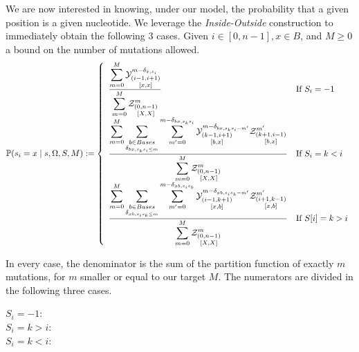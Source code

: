 We are now interested in knowing, under our model, 
 the probability that a given position is a given nucleotide.
We leverage the \emph{Inside-Outside} construction to immediately obtain the following $3$ cases.
Given $i\in[0,n-1],x\in B$, and $M\geq 0$ a bound on the number of mutations allowed. 
$$
	\mathbb{P}(s_i = x\mid s,\Omega, S,M):=\left\{
	\begin{array}{ll}
		\displaystyle
		\frac{
			\displaystyle
			\sum_{m=0}^{M}
			\Y{i-1,i+1}{m-\Kron_{x,s_i}}{x,x}
		}{
			\displaystyle
			\sum_{m=0}^{M}
			\Z{0,n-1}{m}{X,X}
		}
		&\text{If }S_i = -1\\
		\displaystyle
 		\frac{
			\displaystyle
			\sum_{m=0}^{M}
			\sum_{\substack{b\in Bases\\\Kron_{bx,s_ks_i\leq m}}}
			\sum_{m'=0}^{m-\Kron_{bx,s_ks_i}}
			\Y{k-1,i+1}{m-\Kron_{bx,s_ks_i-m'}}{b,x}
			\Z{k+1,i-1}{m'}{b,x}
		}{
			\displaystyle
			\sum_{m=0}^{M}
			\Z{0,n-1}{m}{X,X}
		}
		&\text{If }S_i=k<i\\
		\displaystyle
		\frac{
			\displaystyle
			\sum_{m=0}^{M}
			\sum_{\substack{b\in Bases\\\Kron_{xb,s_is_k\leq m}}}
			\sum_{m'=0}^{m-\Kron_{xb,s_is_k}}
			\Y{i-1,k+1}{m-\Kron_{xb,s_is_k-m'}}{x,b}
			\Z{i+1,k-1}{m'}{x,b}
		}{
			\displaystyle
			\sum_{m=0}^{M}
			\Z{0,n-1}{m}{X,X}
		}
		&\text{If }S[i]=k>i
	\end{array}\right.
$$

In every case, the denominator is the sum of the partition function of exactly $m$ mutations, for $m$ smaller or equal to our target $M$. The numerators are divided in the following three cases.
\begin{description}
\item[$S_i=-1$:]
\item[$S_i=k>i$:]
\item[$S_i=k<i$:]
\end{description}